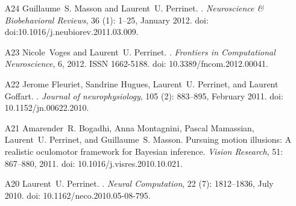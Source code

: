 \documentclass[11pt,french,a4paper,oneside]{article}%
\newcommand{\years}[1]{\marginpar{\textit{\scriptsize #1}}}
\providecommand{\doi}[1]{doi: #1}%
\begin{document}
\begin{enumerate}
\item[A24] %
Guillaume~S. Masson and Laurent~U. Perrinet.
.
\newblock \emph{Neuroscience \& Biobehavioral Reviews}, 36
  (1): 1--25, January 2012.
\newblock \doi{doi:10.1016/j.neubiorev.2011.03.009}.

\item[A23] %
Nicole~Voges and Laurent~U. Perrinet.
.
\newblock \emph{Frontiers in Computational Neuroscience}, 6, 2012.
\newblock ISSN 1662-5188.
\newblock \doi{10.3389/fncom.2012.00041}.


\item[A22] %
Jerome Fleuriet, \years{2011} Sandrine Hugues, Laurent~U. Perrinet, and Laurent Goffart.
.
\newblock \emph{Journal of neurophysiology}, 105 (2):
  883--895, February 2011.
\newblock \doi{10.1152/jn.00622.2010}.


\item[A21] %
Amarender~R. Bogadhi, Anna Montagnini, Pascal Mamassian, Lau\-rent~U. Perrinet,
  and Guillaume~S. Masson.
\newblock Pursuing motion illusions: A realistic oculomotor framework for
  {B}ayesian inference.
\newblock \emph{Vision Research}, 51: 867--880, 2011.
\newblock \doi{10.1016/j.visres.2010.10.021}.


\item[A20] %
Laurent~U. Perrinet.
\years{2010}
.
\newblock \emph{Neural Computation}, 22 (7): 1812--1836, July
  2010.
\newblock \doi{10.1162/neco.2010.05-08-795}.


\end{enumerate}
\end{document}
